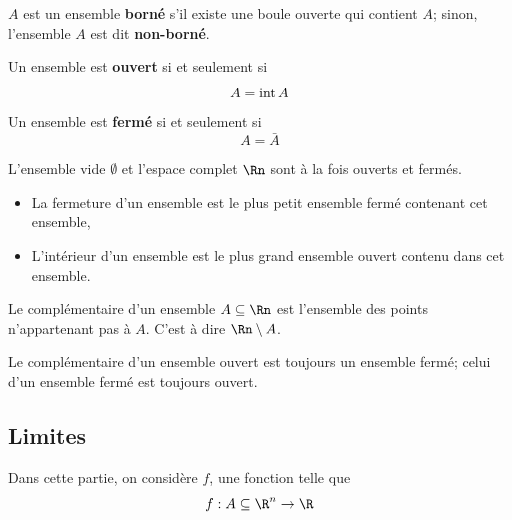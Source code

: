 \begin{mydef}
	$A$ est un ensemble \textbf{borné} s'il existe une boule ouverte qui contient $A$;
	sinon, l'ensemble $A$ est dit \textbf{non-borné}.
\end{mydef}

\begin{mydef}
	Un ensemble est \textbf{ouvert} si et seulement si
	\[ A = \operatorname{int} A \]
	Un ensemble est \textbf{fermé} si et seulement si
	\[ A = \bar{A} \]
\end{mydef}

\begin{myprop}
	L'ensemble vide $\emptyset$ et l'espace complet $\Rn$ sont à la fois ouverts et fermés.
\end{myprop}

\begin{myprop}\InsertTheoremBreak
	\begin{itemize}
		\item La fermeture d'un ensemble est le plus petit ensemble fermé contenant cet ensemble,
		\item L'intérieur d'un ensemble est le plus grand ensemble ouvert contenu dans cet ensemble.
	\end{itemize}
\end{myprop}

\begin{mydef}
	Le complémentaire d'un ensemble $A \subseteq \Rn$ est l'ensemble des points n'appartenant pas à $A$.
	C'est à dire $\Rn \setminus A$.
\end{mydef}

\begin{mytheo}
	Le complémentaire d'un ensemble ouvert est toujours un ensemble fermé;
	celui d'un ensemble fermé est toujours ouvert.
\end{mytheo}

\subsection{Limites}

Dans cette partie, on considère $f$, une fonction telle que
\[ f : A \subseteq \R^n \to \R \]


